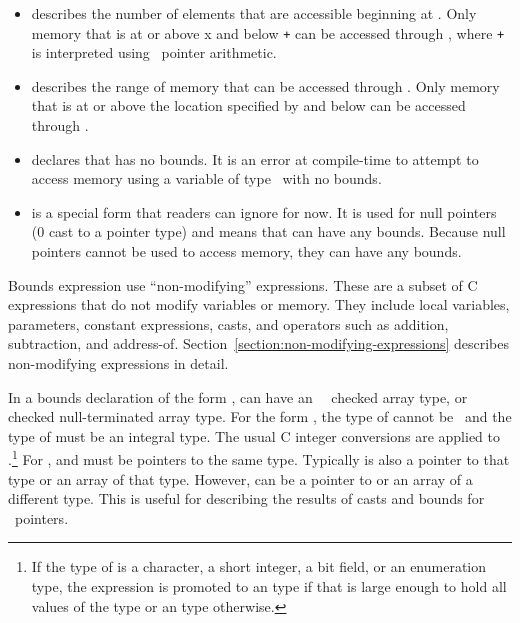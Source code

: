 \begin{itemize}
\item
   describes the number of
  elements that are accessible beginning at . Only memory that
  is at or above x and below  \texttt{+}  can be
  accessed through , where  \texttt{+}  is
  interpreted using \arrayptr\ pointer arithmetic.
\item
  describes the range of memory that can be accessed through .
  Only memory that is at or above the location specified by 
  and below  can be accessed through .
\item
   declares that  has no bounds.
  It is an error at compile-time to attempt to access memory using a
  variable of type \arrayptr\ with no bounds.
\item
   is a special form that readers can
  ignore for now. It is used for null pointers (0 cast to a pointer
  type) and means that  can have any bounds. Because null
  pointers cannot be used to access memory, they can have any bounds.
\end{itemize}

Bounds expression use ``non-modifying'' expressions. These are a subset
of C expressions that do not modify variables or memory. They include
local variables, parameters, constant expressions, casts, and operators
such as addition, subtraction, and address-of. 
Section~\ref{section:non-modifying-expressions}  describes
non-modifying expressions in detail.

In a bounds declaration of the form ,
 can have an \arrayptr\, \ntarrayptr\,  checked array type, or
checked null-terminated array type.
For the form  ,  the type of
 cannot be \arrayptrvoid\ and the type of  must be an integral type.
The usual C integer conversions are applied to .\footnote{If the
type of  is a character, a short integer, a bit field, or an enumeration type,
the expression is promoted to an  type if that is large
enough to  hold all values of the type or an  type otherwise.}
For ,  and
 must be pointers to the same type.  Typically  is also 
a pointer to that type or an array of that type.  
However,  can be a pointer to or an array of a different type.
This is useful for describing the results of casts and
bounds for \arrayptrvoid\ pointers.


